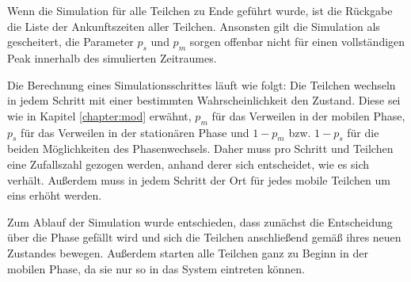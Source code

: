 Wenn die Simulation für alle Teilchen zu Ende geführt wurde, ist die Rückgabe die Liste der Ankunftszeiten aller Teilchen. Ansonsten gilt die Simulation als gescheitert, die Parameter $p_s$ und $p_m$ sorgen offenbar nicht für einen vollständigen Peak innerhalb des simulierten Zeitraumes.

Die Berechnung eines Simulationsschrittes läuft wie folgt: Die Teilchen wechseln in jedem Schritt mit einer bestimmten Wahrscheinlichkeit den Zustand. Diese sei wie in Kapitel \ref{chapter:mod} erwähnt, $p_m$ für das Verweilen in der mobilen Phase, $p_s$ für das Verweilen in der stationären Phase und $1-p_m$ bzw. $1-p_s$ für die beiden Möglichkeiten des Phasenwechsels. Daher muss pro Schritt und Teilchen eine Zufallszahl gezogen werden, anhand derer sich entscheidet, wie es sich verhält. Außerdem muss in jedem Schritt der Ort für jedes mobile Teilchen um eins erhöht werden.

Zum Ablauf der Simulation wurde entschieden, dass zunächst die Entscheidung über die Phase gefällt wird und sich die Teilchen anschließend gemäß ihres neuen Zustandes bewegen. Außerdem starten alle Teilchen ganz zu Beginn in der mobilen Phase, da sie nur so in das System eintreten können.

